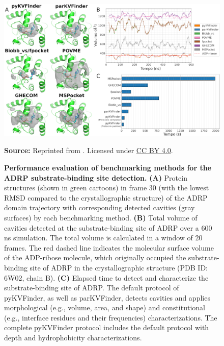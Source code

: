 \documentclass[Ingles]{phdthesis}
\def\eg{e.g.\onedot}
\begin{document}
\begin{figure}[h]
  \centering
  \includegraphics[scale=1.2]{images/pykvfinder-benchmarking.png}
  \centerline{\tiny{\textbf{Source:} Reprinted from \cite{guerra2021}. Licensed under \href{https://creativecommons.org/licenses/by/4.0/}{CC BY 4.0}.}}
  \caption[Performance evaluation of benchmarking methods for the ADRP substrate-binding site detection]{\textbf{Performance evaluation of benchmarking methods for the ADRP substrate-binding site detection.} \textbf{(A)} Protein structures (shown in green cartoons) in frame 30 (with the lowest RMSD compared to the crystallographic structure) of the ADRP domain trajectory with corresponding detected cavities (gray surfaces) by each benchmarking method. \textbf{(B)} Total volume of cavities detected at the substrate-binding site of ADRP over a 600 ns simulation. The total volume is calculated in a window of 20 frames. The red dashed line indicates the molecular surface volume of the ADP-ribose molecule, which originally occupied the substrate-binding site of ADRP in the crystallographic structure (PDB ID: 6W02, chain B). \textbf{(C)} Elapsed time to detect and characterize the substrate-binding site of ADRP. The default protocol of pyKVFinder, as well as parKVFinder, detects cavities and applies morphological (\eg, volume, area, and shape) and constitutional (e.g., interface residues and their frequencies) characterizations. The complete pyKVFinder protocol includes the default protocol with depth and hydrophobicity characterizations.}
  \label{fig:pykvfinder-benchmarking}
\end{figure}
\end{document}
